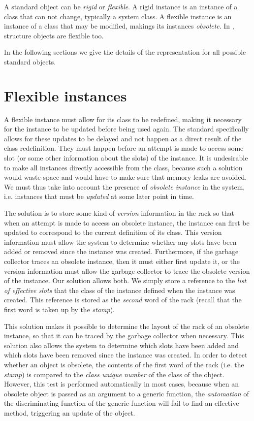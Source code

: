 A standard object can be \emph{rigid} or \emph{flexible}.  A rigid
instance is an instance of a class that can not change, typically a
system class.  A flexible instance is an instance of a class that may
be modified, makings its instances \emph{obsolete}.  In \sysname{},
structure objects are flexible too.

In the following sections we give the details of the representation
for all possible standard objects.

\section{Flexible instances}
\label{sec-data-representation-flexible-instances}

A flexible instance must allow for its class to be redefined, making
it necessary for the instance to be updated before being used again.  The
standard specifically allows for these updates to be delayed and not
happen as a direct result of the class redefinition.  They must happen
before an attempt is made to access some slot (or some other
information about the slots) of the instance.  It is undesirable to
make all instances directly accessible from the class, because
such a solution would waste space and would have to make sure that
memory leaks are avoided.  We must thus take into account the presence
of \emph{obsolete instance} in the system, i.e. instances that must
be \emph{updated} at some later point in time.

The solution is to store some kind of \emph{version} information in
the rack so that when an attempt is made to access an
obsolete instance, the instance can first be updated to correspond to
the current definition of its class.  This version information must
allow the system to determine whether any slots have been added or
removed since the instance was created.  Furthermore, if the garbage
collector traces an obsolete instance, then it must either first
update it, or the version information must allow the garbage collector
to trace the obsolete version of the instance.  Our solution allows
both.  We simply store a reference to the \emph{list of effective
  slots} that the class of the instance defined when the instance was
created.  This reference is stored as the \emph{second} word of the
rack (recall that the first word is taken up by the
\emph{stamp}).

This solution makes it possible to determine the layout of the rack of
an obsolete instance, so that it can be traced by the garbage
collector when necessary.  This solution also allows the system to
determine which slots have been added and which slots have been
removed since the instance was created.  In order to detect whether an
object is obsolete, the contents of the first word of the rack
(i.e. the \emph{stamp}) is compared to the \emph{class unique number}
of the class of the object.  However, this test is performed
automatically in most cases, because when an obsolete object is passed
as an argument to a generic function, the \emph{automation} of the
discriminating function of the generic function will fail to find an
effective method, triggering an update of the object.


